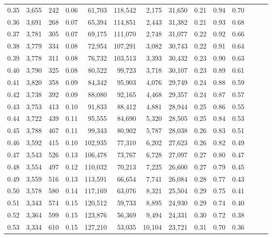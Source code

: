 \begin{tabular}{rrrrrrrrrrrrrr}
0.35 &  3,655 &  242 &  0.06 &   61,703 &  118,542 &   2,175 &  31,650 &  0.21 &  0.94 &      0.70 \\
0.36 &  3,691 &  268 &  0.07 &   65,394 &  114,851 &   2,443 &  31,382 &  0.21 &  0.93 &      0.68 \\
0.37 &  3,781 &  305 &  0.07 &   69,175 &  111,070 &   2,748 &  31,077 &  0.22 &  0.92 &      0.66 \\
0.38 &  3,779 &  334 &  0.08 &   72,954 &  107,291 &   3,082 &  30,743 &  0.22 &  0.91 &      0.64 \\
0.39 &  3,778 &  311 &  0.08 &   76,732 &  103,513 &   3,393 &  30,432 &  0.23 &  0.90 &      0.63 \\
0.40 &  3,790 &  325 &  0.08 &   80,522 &   99,723 &   3,718 &  30,107 &  0.23 &  0.89 &      0.61 \\
0.41 &  3,820 &  358 &  0.09 &   84,342 &   95,903 &   4,076 &  29,749 &  0.24 &  0.88 &      0.59 \\
0.42 &  3,738 &  392 &  0.09 &   88,080 &   92,165 &   4,468 &  29,357 &  0.24 &  0.87 &      0.57 \\
0.43 &  3,753 &  413 &  0.10 &   91,833 &   88,412 &   4,881 &  28,944 &  0.25 &  0.86 &      0.55 \\
0.44 &  3,722 &  439 &  0.11 &   95,555 &   84,690 &   5,320 &  28,505 &  0.25 &  0.84 &      0.53 \\
0.45 &  3,788 &  467 &  0.11 &   99,343 &   80,902 &   5,787 &  28,038 &  0.26 &  0.83 &      0.51 \\
0.46 &  3,592 &  415 &  0.10 &  102,935 &   77,310 &   6,202 &  27,623 &  0.26 &  0.82 &      0.49 \\
0.47 &  3,543 &  526 &  0.13 &  106,478 &   73,767 &   6,728 &  27,097 &  0.27 &  0.80 &      0.47 \\
0.48 &  3,554 &  497 &  0.12 &  110,032 &   70,213 &   7,225 &  26,600 &  0.27 &  0.79 &      0.45 \\
0.49 &  3,559 &  516 &  0.13 &  113,591 &   66,654 &   7,741 &  26,084 &  0.28 &  0.77 &      0.43 \\
0.50 &  3,578 &  580 &  0.14 &  117,169 &   63,076 &   8,321 &  25,504 &  0.29 &  0.75 &      0.41 \\
0.51 &  3,343 &  574 &  0.15 &  120,512 &   59,733 &   8,895 &  24,930 &  0.29 &  0.74 &      0.40 \\
0.52 &  3,364 &  599 &  0.15 &  123,876 &   56,369 &   9,494 &  24,331 &  0.30 &  0.72 &      0.38 \\
0.53 &  3,334 &  610 &  0.15 &  127,210 &   53,035 &  10,104 &  23,721 &  0.31 &  0.70 &      0.36 \\

\end{tabular}
